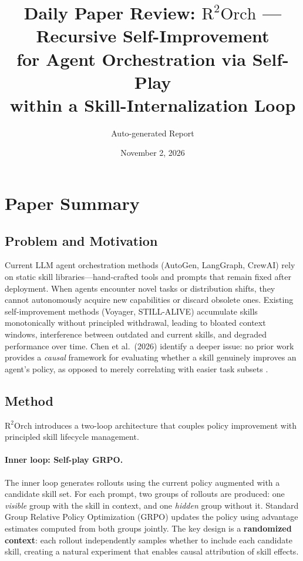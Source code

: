 \documentclass[11pt,a4paper]{article}
\title{Daily Paper Review: $\mathrm{R^2Orch}$ --- Recursive Self-Improvement\\for Agent Orchestration via Self-Play\\within a Skill-Internalization Loop}
\author{Auto-generated Report}
\date{November 2, 2026}
\begin{document}
\maketitle

\section{Paper Summary}

\subsection{Problem and Motivation}
Current LLM agent orchestration methods (AutoGen, LangGraph, CrewAI) rely on static skill libraries---hand-crafted tools and prompts that remain fixed after deployment. When agents encounter novel tasks or distribution shifts, they cannot autonomously acquire new capabilities or discard obsolete ones. Existing self-improvement methods (Voyager, STILL-ALIVE) accumulate skills monotonically without principled withdrawal, leading to bloated context windows, interference between outdated and current skills, and degraded performance over time. Chen et al.\ (2026) identify a deeper issue: no prior work provides a \emph{causal} framework for evaluating whether a skill genuinely improves an agent's policy, as opposed to merely correlating with easier task subsets \cite{chen2026r2orch}.

\subsection{Method}
$\mathrm{R^2Orch}$ introduces a two-loop architecture that couples policy improvement with principled skill lifecycle management.

\paragraph{Inner loop: Self-play GRPO.} The inner loop generates rollouts using the current policy augmented with a candidate skill set. For each prompt, two groups of rollouts are produced: one \emph{visible} group with the skill in context, and one \emph{hidden} group without it. Standard Group Relative Policy Optimization (GRPO) updates the policy using advantage estimates computed from both groups jointly. The key design is a \textbf{randomized context}: each rollout independently samples whether to include each candidate skill, creating a natural experiment that enables causal attribution of skill effects.
\end{document}
